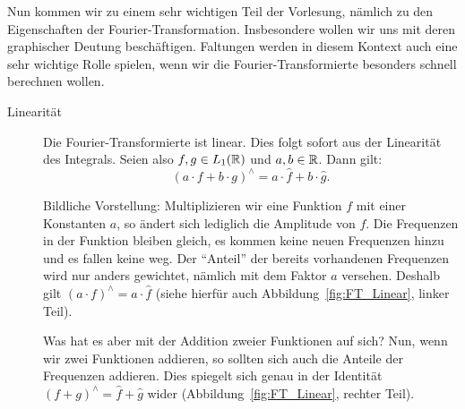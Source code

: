 Nun kommen wir zu einem sehr wichtigen Teil der Vorlesung, nämlich zu den Eigenschaften der
Fourier-Transformation. Insbesondere wollen wir uns mit deren graphischer Deutung beschäftigen.
Faltungen werden in diesem Kontext auch eine sehr wichtige Rolle spielen, wenn wir die
Fourier-Transformierte besonders schnell berechnen wollen.

\begin{remark}
  \label{prop:properties_fourier} \leavevmode
	\begin{description}
  	\item [Linearität] Die Fourier-Transformierte ist linear. Dies folgt sofort aus der Linearität 
  	des Integrals. Seien also $ f, g \in L_{1}(\mathbb{R}) $ und $ a, b \in \mathbb{R} $. Dann gilt:
    	\[
      	(a \cdot f + b \cdot g)^{\wedge} = a \cdot \widehat{f} + b \cdot \widehat{g}.
    	\]
    
    Bildliche Vorstellung: Multiplizieren wir eine Funktion $ f $ mit einer Konstanten $ a $, so
    ändert sich lediglich die Amplitude von $ f $. Die Frequenzen in der Funktion bleiben gleich,
    es kommen keine neuen Frequenzen hinzu und es fallen keine weg. Der \enquote{Anteil} der bereits
    vorhandenen Frequenzen wird nur anders gewichtet, nämlich mit dem Faktor $ a $ versehen. 
    Deshalb gilt $ (a \cdot f)^{\wedge} = a \cdot \widehat{f} $ (siehe hierfür auch 
    Abbildung~\ref{fig:FT_Linear}, linker Teil).
    
    Was hat es aber mit der Addition zweier Funktionen auf sich? Nun, wenn wir zwei Funktionen 
    addieren, so sollten sich auch die Anteile der Frequenzen addieren. Dies spiegelt sich genau in 
    der Identität $ (f + g)^{\wedge} = \widehat{f} + \widehat{g} $ wider 
    (Abbildung~\ref{fig:FT_Linear}, rechter Teil).
    

\end{description}
\end{remark}
